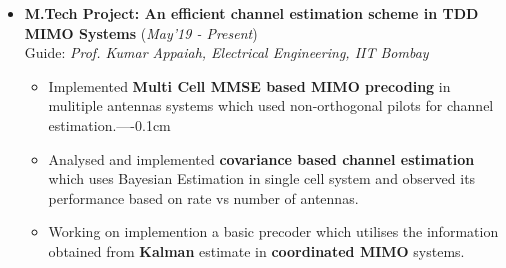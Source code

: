 \documentclass[10pt]{article}
\begin{document}

\vspace*{115pt}


\colorbox{bl}{}%
\vspace{-0.08cm}
\begin{itemize}[leftmargin=0.4cm]
\item \textbf{M.Tech Project: An efficient channel estimation scheme in TDD MIMO Systems}
\hfill{(\textit{May'19 - Present})} \\
Guide: \textit{Prof. Kumar Appaiah, Electrical Engineering, IIT Bombay}\\
\vspace{-0.6cm}
\begin{itemize}
\item Implemented \textbf{Multi Cell MMSE based MIMO precoding} in mulitiple antennas systems which used non-orthogonal pilots for channel estimation.\vspace---{-0.1cm}
\item Analysed and implemented \textbf{covariance based channel estimation} which uses Bayesian Estimation in single cell system and observed its performance based on rate vs number of antennas. 
\vspace{-0.1cm}
\end{itemize}
\vspace{-0.2cm}

\begin{itemize}
\item  Working on implemention a basic precoder which utilises the information obtained from \textbf{Kalman} estimate in \textbf{coordinated MIMO} systems.\vspace{-0.1cm}
\end{itemize}


\end{itemize}
\end{document}
